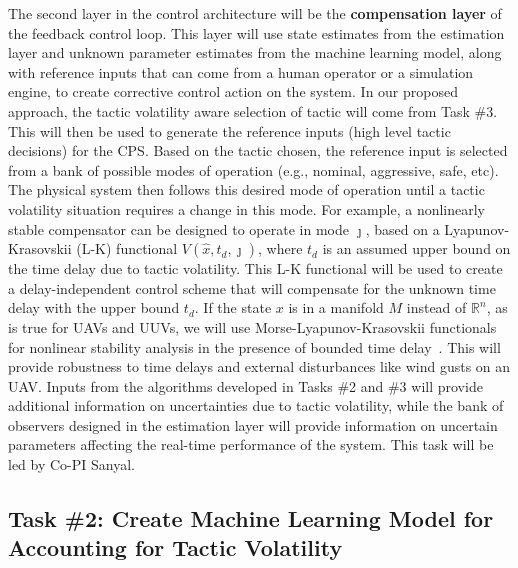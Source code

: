 \documentclass[11pt]{proposalnsf}
\newcommand{\dan}[1]{\textcolor{blue}{{\it [Dan says: #1]}}}
\newcommand{\amit}[1]{\textcolor{red}{{\it [Amit: #1]}}}
\newlength\q %
\begin{document}
\begin{sloppypar}
The second layer in the control architecture will be the {\bf compensation layer} of the feedback control loop. This layer will use state estimates from the estimation layer and unknown parameter estimates from the machine learning model, along with reference inputs that can come from a human operator or a simulation engine, to create corrective control action on the system. In our proposed approach, the tactic volatility aware selection of tactic will come from Task \#3. This will then be used to generate the reference inputs (high level tactic decisions) for the CPS. Based on the tactic chosen, the reference input is selected from a bank of possible modes of operation (e.g., nominal, aggressive, safe, etc). The physical system then follows this desired mode of operation until a tactic volatility situation requires a change in this mode. For example, a nonlinearly stable compensator can be designed to operate in mode $\jmath$, based on a Lyapunov-Krasovskii (L-K) functional $V(\hat x,t_d,\jmath)$, where $t_d$ is an assumed upper bound on the time delay due to tactic volatility. This L-K functional will be used to create a delay-independent control scheme that will compensate for the unknown time delay with the upper bound $t_d$. If the state $x$ is in a manifold $M$ instead of $\mathbb{R}^n$, as is true for UAVs and UUVs, we will use Morse-Lyapunov-Krasovskii functionals for nonlinear stability analysis in the presence of bounded time delay~\cite{ebsp15, nbys16}. This will provide robustness to time delays and external disturbances like wind gusts on an UAV. Inputs from the algorithms developed in Tasks \#2 and \#3 will provide additional information on uncertainties due to tactic volatility, while the bank of observers designed in the estimation layer will provide information on uncertain parameters affecting the real-time performance of the system. This task will be led by Co-PI Sanyal.




\subsection*{Task \#2: Create Machine Learning Model for Accounting for Tactic Volatility}


\end{sloppypar}
\end{document}
